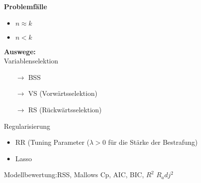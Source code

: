 \textbf{Problemfälle}
\begin{itemize}
	\item \(n \approx k\)
	\item \(n < k\)
\end{itemize}
\textbf{Auswege:} \\
Variablenselektion
\begin{itemize}
	\item[\(\rightarrow\)] BSS
	\item[\(\rightarrow\)] VS (Vorwärtsselektion)
	\item[\(\rightarrow\)] RS (Rückwärtsselektion)
\end{itemize}
Regularisierung
\begin{itemize}
	\item RR (Tuning Parameter (\(\lambda > 0\) für die Stärke der Bestrafung)
	\item Lasso
\end{itemize}

Modellbewertung:RSS, Mallows Cp, AIC, BIC, $R^2$ $R_adj^2$


